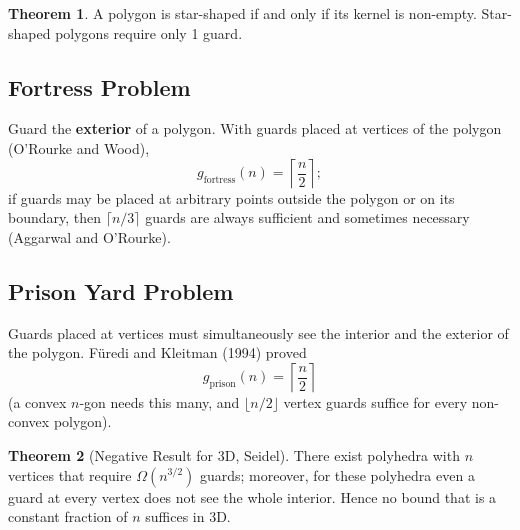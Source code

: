 \documentclass{article}
\theoremstyle{definition}
\newtheorem{theorem}{Theorem}
\begin{document}
\begin{center}
\end{center}

\begin{theorem}
A polygon is star-shaped if and only if its kernel is non-empty. Star-shaped polygons require only 1 guard.
\end{theorem}


\subsection{Fortress Problem}
Guard the \textbf{exterior} of a polygon. With guards placed at vertices of the polygon (O'Rourke and Wood),
$$g_{\text{fortress}}(n) = \left\lceil \frac{n}{2} \right\rceil;$$
if guards may be placed at arbitrary points outside the polygon or on its boundary, then $\lceil n/3 \rceil$ guards are always sufficient and sometimes necessary (Aggarwal and O'Rourke).

\subsection{Prison Yard Problem}
Guards placed at vertices must simultaneously see the interior and the exterior of the polygon. F\"{u}redi and Kleitman (1994) proved
$$g_{\text{prison}}(n) = \left\lceil \frac{n}{2} \right\rceil$$
(a convex $n$-gon needs this many, and $\lfloor n/2 \rfloor$ vertex guards suffice for every non-convex polygon).


\begin{theorem}[Negative Result for 3D, Seidel]
There exist polyhedra with $n$ vertices that require $\Omega(n^{3/2})$ guards; moreover, for these polyhedra even a guard at every vertex does not see the whole interior. Hence no bound that is a constant fraction of $n$ suffices in 3D.
\end{theorem}
\end{document}
